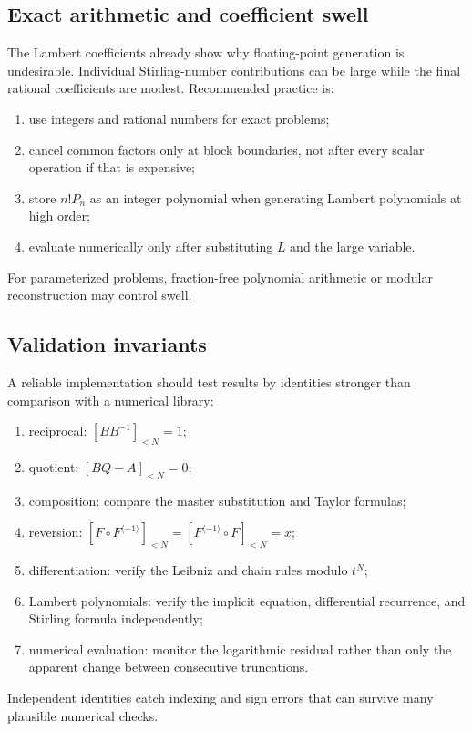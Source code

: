 \documentclass[11pt]{article}
\theoremstyle{pltheorem}
\newcommand{\rev}{\langle-1\rangle}
\newcommand{\compose}{\mathbin{\circ}}
\begin{document}
\subsection{Exact arithmetic and coefficient swell}

The Lambert coefficients already show why floating-point generation is undesirable.  Individual Stirling-number contributions can be large while the final rational coefficients are modest.  Recommended practice is:
\begin{enumerate}
\item use integers and rational numbers for exact problems;
\item cancel common factors only at block boundaries, not after every scalar operation if that is expensive;
\item store \(n!P_n\) as an integer polynomial when generating Lambert polynomials at high order;
\item evaluate numerically only after substituting \(L\) and the large variable.
\end{enumerate}
For parameterized problems, fraction-free polynomial arithmetic or modular reconstruction may control swell.

\subsection{Validation invariants}

A reliable implementation should test results by identities stronger than comparison with a numerical library:
\begin{enumerate}
\item reciprocal: \([BB^{-1}]_{<N}=1\);
\item quotient: \([BQ-A]_{<N}=0\);
\item composition: compare the master substitution and Taylor formulas;
\item reversion: \([F\compose F^{\rev}]_{<N}=[F^{\rev}\compose F]_{<N}=x\);
\item differentiation: verify the Leibniz and chain rules modulo \(t^N\);
\item Lambert polynomials: verify the implicit equation, differential recurrence, and Stirling formula independently;
\item numerical evaluation: monitor the logarithmic residual rather than only the apparent change between consecutive truncations.
\end{enumerate}
Independent identities catch indexing and sign errors that can survive many plausible numerical checks.
\end{document}
